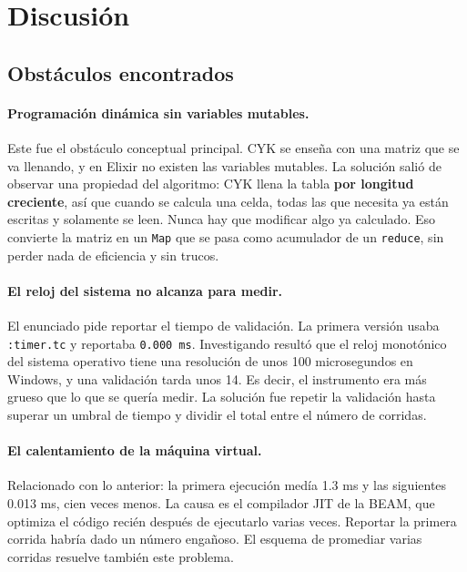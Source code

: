 \documentclass[11pt,a4paper]{article}
\begin{document}
\section{Discusión}

\subsection{Obstáculos encontrados}

\paragraph{Programación dinámica sin variables mutables.}
Este fue el obstáculo conceptual principal. CYK se enseña con una matriz que
se va llenando, y en Elixir no existen las variables mutables. La solución
salió de observar una propiedad del algoritmo: CYK llena la tabla
\textbf{por longitud creciente}, así que cuando se calcula una celda, todas
las que necesita ya están escritas y solamente se leen. Nunca hay que
modificar algo ya calculado. Eso convierte la matriz en un \texttt{Map} que se
pasa como acumulador de un \texttt{reduce}, sin perder nada de eficiencia y
sin trucos.

\paragraph{El reloj del sistema no alcanza para medir.}
El enunciado pide reportar el tiempo de validación. La primera versión usaba
\texttt{:timer.tc} y reportaba \texttt{0.000 ms}. Investigando resultó que el
reloj monotónico del sistema operativo tiene una resolución de unos 100
microsegundos en Windows, y una validación tarda unos 14. Es decir, el
instrumento era más grueso que lo que se quería medir. La solución fue repetir
la validación hasta superar un umbral de tiempo y dividir el total entre el
número de corridas.

\paragraph{El calentamiento de la máquina virtual.}
Relacionado con lo anterior: la primera ejecución medía 1.3 ms y las
siguientes 0.013 ms, cien veces menos. La causa es el compilador JIT de la
BEAM, que optimiza el código recién después de ejecutarlo varias veces.
Reportar la primera corrida habría dado un número engañoso. El esquema de
promediar varias corridas resuelve también este problema.
\end{document}

